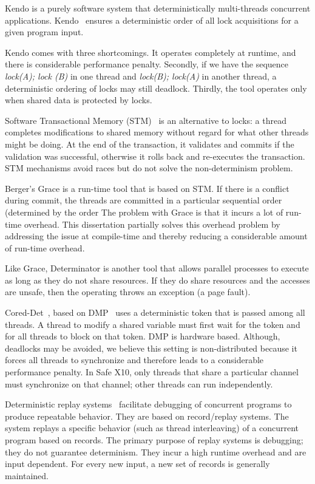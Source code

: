 Kendo is a purely software system that deterministically multi-threads
concurrent applications.  Kendo~\cite{olszewski2009kendo} ensures a
deterministic order of all lock acquisitions for a given program
input.

Kendo comes with three shortcomings. It operates completely at runtime,
and there is considerable performance penalty. Secondly, if
we have the sequence \emph{lock(A); lock (B)} in one thread and
\emph{lock(B); lock(A)} in another thread, a deterministic ordering of
locks may still deadlock. Thirdly, the tool operates only when
shared data is protected by locks.

Software Transactional Memory (STM)~\cite{shavit1995software}
  is an alternative to locks: a thread completes modifications to 
shared memory without regard for what other threads might be doing. At the end of the transaction,
it validates and commits if the validation was successful, otherwise it rolls back and re-executes
the transaction. STM mechanisms avoid races but do not solve the non-determinism problem.

Berger's Grace\cite{berger2009grace} is a run-time tool
that is based on STM. 
If there is a conflict during commit, the threads are committed in
a particular sequential order (determined by the order
The problem with Grace is that it incurs a lot of run-time
overhead. This dissertation  partially solves this overhead problem
by addressing the issue at compile-time and
thereby reducing a considerable amount of run-time overhead.

Like Grace, Determinator\cite{aviram2010efficient} is another tool
that allows parallel processes to execute as long as they do not share 
resources. If they do share resources and the accesses are unsafe, then
the operating throws an exception (a page fault). 

Cored-Det~\cite{bergan2010coreDet}, based on DMP~\cite{devietti2009dmp} 
uses a deterministic token that is passed
among all threads.  A thread to modify a shared variable must first
wait for the token and for all threads to block on that
token. DMP is hardware based. 
Although, deadlocks may be avoided, we believe this setting is
non-distributed because it forces all threads to synchronize and
therefore leads to a considerable performance penalty. In Safe X10,
only threads that share a particular channel must synchronize
on that channel; other threads can run independently.

 Deterministic replay systems~\cite{choi1998deterministic,altekar2009odr} facilitate debugging of concurrent programs to produce
repeatable behavior. They are based on record/replay systems. The system
replays a specific behavior (such as thread interleaving) of a concurrent
program based on records. The primary purpose of replay systems 
is debugging; they do not guarantee determinism. 
They incur a high runtime overhead and are input dependent.
For every new input, a new set of records is generally maintained.

